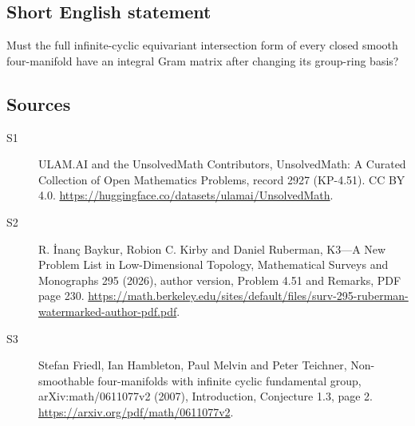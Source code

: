 \documentclass[11pt]{article}
\begin{document}
\subsection{Short English statement}
Must the full infinite-cyclic equivariant intersection form of every closed smooth four-manifold have an integral Gram matrix after changing its group-ring basis?
\subsection{Sources}
\begin{description}
\item[\hypertarget{source:2927:1}{S1}] ULAM.AI and the UnsolvedMath Contributors, UnsolvedMath: A Curated Collection of Open Mathematics Problems, record 2927 (KP-4.51). CC BY 4.0. \url{https://huggingface.co/datasets/ulamai/UnsolvedMath}.
\item[\hypertarget{source:2927:2}{S2}] R. İnanç Baykur, Robion C. Kirby and Daniel Ruberman, K3—A New Problem List in Low-Dimensional Topology, Mathematical Surveys and Monographs 295 (2026), author version, Problem 4.51 and Remarks, PDF page 230. \url{https://math.berkeley.edu/sites/default/files/surv-295-ruberman-watermarked-author-pdf.pdf}.
\item[\hypertarget{source:2927:3}{S3}] Stefan Friedl, Ian Hambleton, Paul Melvin and Peter Teichner, Non-smoothable four-manifolds with infinite cyclic fundamental group, arXiv:math/0611077v2 (2007), Introduction, Conjecture 1.3, page 2. \url{https://arxiv.org/pdf/math/0611077v2}.
\end{description}
\label{end:2927}
\end{document}
